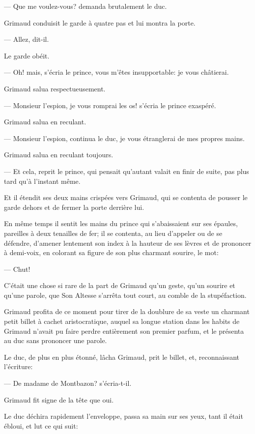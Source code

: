 — Que me voulez-vous? demanda brutalement le duc.

Grimaud conduisit le garde à quatre pas et lui montra la porte.

— Allez, dit-il.

Le garde obéit.

— Oh! mais, s'écria le prince, vous m'êtes insupportable: je vous châtierai.

Grimaud salua respectueusement.

— Monsieur l'espion, je vous romprai les os! s'écria le prince exaspéré.

Grimaud salua en reculant.

— Monsieur l'espion, continua le duc, je vous étranglerai de mes propres mains.

Grimaud salua en reculant toujours.

— Et cela, reprit le prince, qui pensait qu'autant valait en finir de suite, pas plus tard qu'à l'instant même.

Et il étendit ses deux mains crispées vers Grimaud, qui se contenta de pousser le garde dehors et de fermer la porte derrière lui.

En même temps il sentit les mains du prince qui s'abaissaient sur ses épaules, pareilles à deux tenailles de fer; il se contenta, au lieu d'appeler ou de se défendre, d'amener lentement son index à la hauteur de ses lèvres et de prononcer à demi-voix, en colorant sa figure de son plus charmant sourire, le mot:

— Chut!

C'était une chose si rare de la part de Grimaud qu'un geste, qu'un sourire et qu'une parole, que Son Altesse s'arrêta tout court, au comble de la stupéfaction.

Grimaud profita de ce moment pour tirer de la doublure de sa veste un charmant petit billet à cachet aristocratique, auquel sa longue station dans les habits de Grimaud n'avait pu faire perdre entièrement son premier parfum, et le présenta au duc sans prononcer une parole.

Le duc, de plus en plus étonné, lâcha Grimaud, prit le billet, et, reconnaissant l'écriture:

— De madame de Montbazon? s'écria-t-il.

Grimaud fit signe de la tête que oui.

Le duc déchira rapidement l'enveloppe, passa sa main sur ses yeux, tant il était ébloui, et lut ce qui suit:


